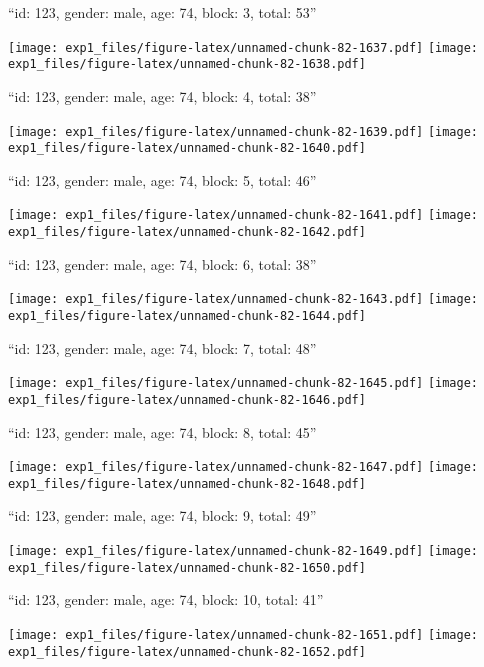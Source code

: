 \documentclass[11pt,,]{article}
\begin{document}
\newpage
[1] 

``id: 123, gender: male, age: 74, block: 3, total: 53''

\texttt{[image: exp1\_files/figure-latex/unnamed-chunk-82-1637.pdf]}
\texttt{[image: exp1\_files/figure-latex/unnamed-chunk-82-1638.pdf]}

\newpage
[1] 

``id: 123, gender: male, age: 74, block: 4, total: 38''

\texttt{[image: exp1\_files/figure-latex/unnamed-chunk-82-1639.pdf]}
\texttt{[image: exp1\_files/figure-latex/unnamed-chunk-82-1640.pdf]}

\newpage
[1] 

``id: 123, gender: male, age: 74, block: 5, total: 46''

\texttt{[image: exp1\_files/figure-latex/unnamed-chunk-82-1641.pdf]}
\texttt{[image: exp1\_files/figure-latex/unnamed-chunk-82-1642.pdf]}

\newpage
[1] 

``id: 123, gender: male, age: 74, block: 6, total: 38''

\texttt{[image: exp1\_files/figure-latex/unnamed-chunk-82-1643.pdf]}
\texttt{[image: exp1\_files/figure-latex/unnamed-chunk-82-1644.pdf]}

\newpage
[1] 

``id: 123, gender: male, age: 74, block: 7, total: 48''

\texttt{[image: exp1\_files/figure-latex/unnamed-chunk-82-1645.pdf]}
\texttt{[image: exp1\_files/figure-latex/unnamed-chunk-82-1646.pdf]}

\newpage
[1] 

``id: 123, gender: male, age: 74, block: 8, total: 45''

\texttt{[image: exp1\_files/figure-latex/unnamed-chunk-82-1647.pdf]}
\texttt{[image: exp1\_files/figure-latex/unnamed-chunk-82-1648.pdf]}

\newpage
[1] 

``id: 123, gender: male, age: 74, block: 9, total: 49''

\texttt{[image: exp1\_files/figure-latex/unnamed-chunk-82-1649.pdf]}
\texttt{[image: exp1\_files/figure-latex/unnamed-chunk-82-1650.pdf]}

\newpage
[1] 

``id: 123, gender: male, age: 74, block: 10, total: 41''

\texttt{[image: exp1\_files/figure-latex/unnamed-chunk-82-1651.pdf]}
\texttt{[image: exp1\_files/figure-latex/unnamed-chunk-82-1652.pdf]}
\end{document}

